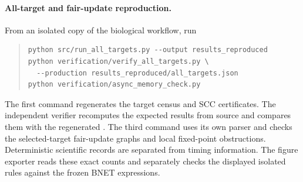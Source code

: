 \begin{samepage}
\paragraph{All-target and fair-update reproduction.}
From an isolated copy of the biological workflow, run
\begin{quote}\small\begin{verbatim}
python src/run_all_targets.py --output results_reproduced
python verification/verify_all_targets.py \
  --production results_reproduced/all_targets.json
python verification/async_memory_check.py
\end{verbatim}\end{quote}
\end{samepage}
The first command regenerates the target census and SCC certificates.
The independent verifier recomputes the expected results from source and
compares them with the regenerated .
The third command
uses its own parser and checks the selected-target fair-update graphs
and local fixed-point obstructions. Deterministic scientific records are
separated from timing information. The figure exporter reads these exact
counts and separately checks the displayed isolated rules against the
frozen BNET expressions.


